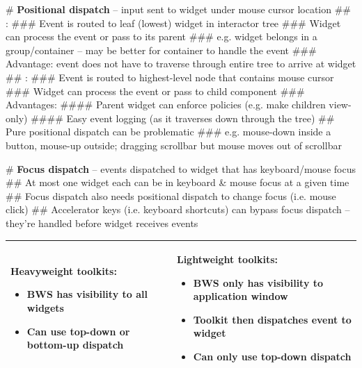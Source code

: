 \documentclass[11pt, oneside]{article}
\newcommand*{\un}[1]{\underline{\smash{#1}}}        %
\newenvironment{itemized}{\begin{itemize}[noitemsep, topsep=0pt, leftmargin=*]}{\end{itemize}}  %
\begin{document}
# \textbf{Positional dispatch} -- input sent to widget under mouse cursor location
## \un{Bottom-up dispatch}:
### Event is routed to leaf (lowest) widget in interactor tree
### Widget can process the event or pass to its parent
### e.g. widget belongs in a group/container -- may be better for container to handle the event
### Advantage: event does not have to traverse through entire tree to arrive at widget
## \un{Top-down dispatch}:
### Event is routed to highest-level node that contains mouse cursor
### Widget can process the event or pass to child component
### Advantages:
#### Parent widget can enforce policies (e.g. make children view-only)
#### Easy event logging (as it traverses down through the tree)
## Pure positional dispatch can be problematic
### e.g. mouse-down inside a button, mouse-up outside; dragging scrollbar but mouse moves out of scrollbar

# \textbf{Focus dispatch} -- events dispatched to widget that has keyboard/mouse focus
## At most one widget each can be in keyboard \& mouse focus at a given time
## Focus dispatch also needs positional dispatch to change focus (i.e. mouse click)
## Accelerator keys (i.e. keyboard shortcuts) can bypass focus dispatch -- they're handled before widget receives events

\hspace{-2em}
\begin{tabular}{|l|l|}
\hline
\begin{minipage}[t]{0.45\textwidth}
\textbf{Heavyweight toolkits}:
    \begin{itemized}
    \item BWS has visibility to all widgets
    \item Can use top-down or bottom-up dispatch
    \end{itemized}
    \vspace*{0.5em}
\end{minipage}
&
\begin{minipage}[t]{0.45\textwidth}
\textbf{Lightweight toolkits}:
    \begin{itemized}
    \item BWS only has visibility to application window
    \item Toolkit then dispatches event to widget
    \item Can only use top-down dispatch
    \end{itemized}
    \vspace*{0.5em}
\end{minipage}  \\
\hline
\end{tabular} \\
\end{document}
